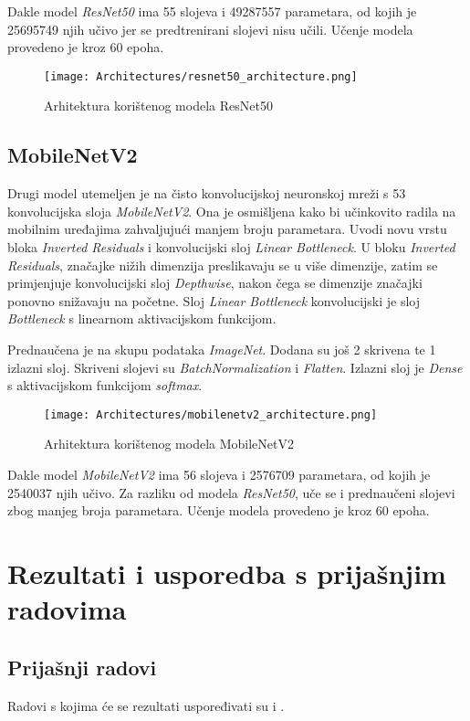 \documentclass[conference, utf8]{IEEEtran}
\begin{document}
	Dakle model \textit{ResNet50} ima 55 slojeva i 49287557 parametara, od kojih je 25695749 njih učivo jer se predtrenirani slojevi nisu učili. Učenje modela provedeno je kroz 60 epoha.

 	\begin{figure}[H]
		\centering
		\texttt{[image: Architectures/resnet50\_architecture.png]}
		\caption{Arhitektura korištenog modela ResNet50}
		\label{fig:resnet50model}
	\end{figure}
	
	\subsection{MobileNetV2}
	Drugi model utemeljen je na čisto konvolucijskoj neuronskoj mreži s 53 konvolucijska sloja \textit{MobileNetV2}. Ona je osmišljena kako bi učinkovito radila na mobilnim uređajima zahvaljujući manjem broju parametara. Uvodi novu vrstu bloka \textit{Inverted Residuals} i konvolucijski sloj \textit{Linear Bottleneck}. U bloku \textit{Inverted Residuals}, značajke nižih dimenzija preslikavaju se u više dimenzije, zatim se primjenjuje konvolucijski sloj \textit{Depthwise}, nakon čega se dimenzije značajki ponovno snižavaju na početne. Sloj \textit{Linear Bottleneck} konvolucijski je sloj \textit{Bottleneck} s linearnom aktivacijskom funkcijom.
	
	Prednaučena je na skupu podataka \textit{ImageNet}. Dodana su još 2 skrivena te 1 izlazni sloj. Skriveni slojevi su \textit{BatchNormalization} i \textit{Flatten}. Izlazni sloj je \textit{Dense} s aktivacijskom funkcijom \textit{softmax}.
	
	\begin{figure}[H]
		\centering
		\texttt{[image: Architectures/mobilenetv2\_architecture.png]}
		\caption{Arhitektura korištenog modela MobileNetV2}
		\label{fig:mobilenetv2model}
	\end{figure}
	
	Dakle model \textit{MobileNetV2} ima 56 slojeva i 2576709 parametara, od kojih je 2540037 njih učivo. Za razliku od modela \textit{ResNet50}, uče se i prednaučeni slojevi zbog manjeg broja parametara. Učenje modela provedeno je kroz 60 epoha.
	
	\section{Rezultati i usporedba s prijašnjim radovima}
	\subsection{Prijašnji radovi}
	Radovi s kojima će se rezultati uspoređivati su \cite{RAD1} i \cite{RAD2}. 
	
\end{document}

